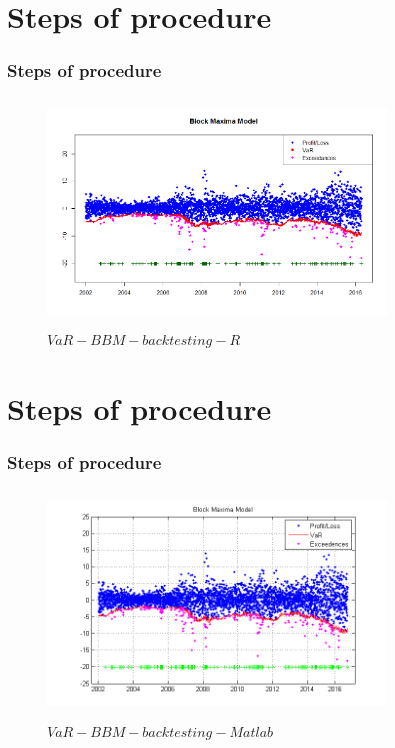 \documentclass[12pt]{beamer}
\begin{document}
\section{Steps of procedure}
\begin{frame}
	\frametitle{Steps of procedure}
	\begin{figure}[htpb!]
      \centering
      \includegraphics[width=9cm,height=6cm]{VaR_BBM_backtesting_R.png}
      \caption{$VaR-BBM-backtesting-R$}
    \end{figure}
\end{frame}


\section{Steps of procedure}
\begin{frame}
	\frametitle{Steps of procedure}
      \begin{figure}[htpb!]
        \centering
        \includegraphics[width=9cm,height=6cm]{VaR_BBM_backtesting_Matlab.png}
        \caption{$VaR-BBM-backtesting-Matlab$}
      \end{figure}
\end{frame}
\end{document}
